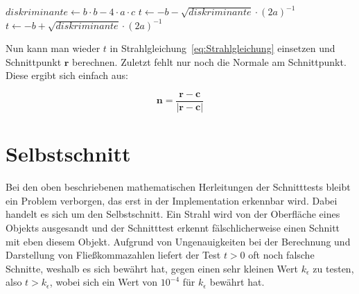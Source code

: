 \begin{algorithm}[H]
    \caption{Kugel Schnitttest}
    \label{alg:kugel_schnitt}
    \begin{algorithmic}[1]
        \State \( diskriminante \gets b \cdot b - 4 \cdot a \cdot c  \)
        \State{}
        \EndIf
        \State \( t \gets -b - \sqrt{diskriminante} \cdot (2a)^{-1}  \) 
        \State{}
        \EndIf
        \State \( t \gets -b + \sqrt{diskriminante} \cdot (2a)^{-1}  \) 
        \State{}
        \EndIf
        \State{}     
    \end{algorithmic}
\end{algorithm}

Nun kann man wieder \( t \) in Strahlgleichung~\ref{eq:Strahlgleichung} einsetzen und Schnittpunkt \( \boldsymbol{r} \) berechnen.
Zuletzt fehlt nur noch die Normale am Schnittpunkt. Diese ergibt sich einfach aus:

\begin{equation*}
    \boldsymbol{n} = \frac{\boldsymbol{r} - \boldsymbol{c} } {|\boldsymbol{r} - \boldsymbol{c}|}
\end{equation*}


\section{Selbstschnitt}

Bei den oben beschriebenen mathematischen Herleitungen der Schnitttests bleibt ein Problem verborgen, das erst in der Implementation erkennbar wird. Dabei handelt es sich um den Selbstschnitt. Ein Strahl wird von der Oberfläche eines Objekts ausgesandt und der Schnitttest erkennt fälschlicherweise einen Schnitt mit eben diesem Objekt. Aufgrund von Ungenauigkeiten bei der Berechnung und Darstellung von Fließkommazahlen liefert der Test \( t > 0 \) oft noch falsche Schnitte, weshalb es sich bewährt hat, gegen einen sehr kleinen Wert \( k_\epsilon \) zu testen, also \( t > k_\epsilon \), wobei sich ein Wert von \( 10^{-4} \) für \( k_\epsilon \) bewährt hat.



